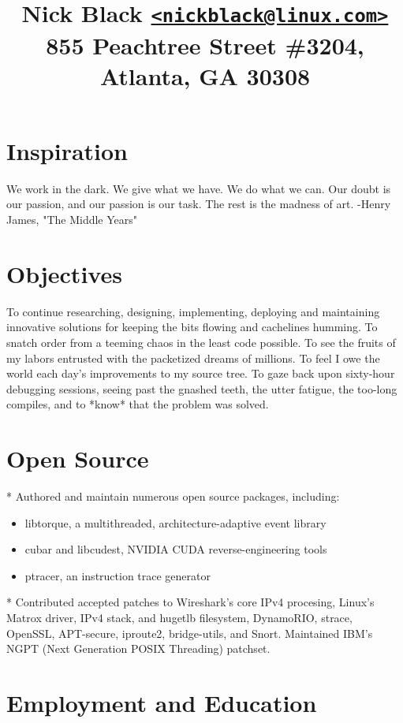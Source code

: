 \documentclass{article}
\author{}
\title{
\bf\Large{Nick Black \href{mailto:nickblack@linux.com}{\nolinkurl{<nickblack@linux.com>}}}\\
\bf\Large{855 Peachtree Street \#3204, Atlanta, GA 30308}
}
\date{}
\begin{document}
\maketitle
\section{Inspiration}

We work in the dark. We give what we have. We do what we can.
Our doubt is our passion, and our passion is our task.
The rest is the madness of art. -Henry James, "The Middle Years"

\section{Objectives}

To continue researching, designing, implementing, deploying and maintaining
innovative solutions for keeping the bits flowing and cachelines humming.
To snatch order from a teeming chaos in the least code possible. To see the
fruits of my labors entrusted with the packetized dreams of millions. To feel I
owe the world each day's improvements to my source tree. To gaze back upon
sixty-hour debugging sessions, seeing past the gnashed teeth, the utter
fatigue, the too-long compiles, and to *know* that the problem was solved.

\section{Open Source}

* Authored and maintain numerous open source packages, including:

\begin{itemize}
\item libtorque, a multithreaded, architecture-adaptive event library
\item cubar and libcudest, NVIDIA CUDA reverse-engineering tools
\item ptracer, an instruction trace generator
\end{itemize}

* Contributed accepted patches to Wireshark's core IPv4 procesing, Linux's
  Matrox driver, IPv4 stack, and hugetlb filesystem, DynamoRIO,
  strace, OpenSSL, APT-secure, iproute2, bridge-utils, and Snort.
  Maintained IBM's NGPT (Next Generation POSIX Threading) patchset.

\section{Employment and Education}
\end{document}
